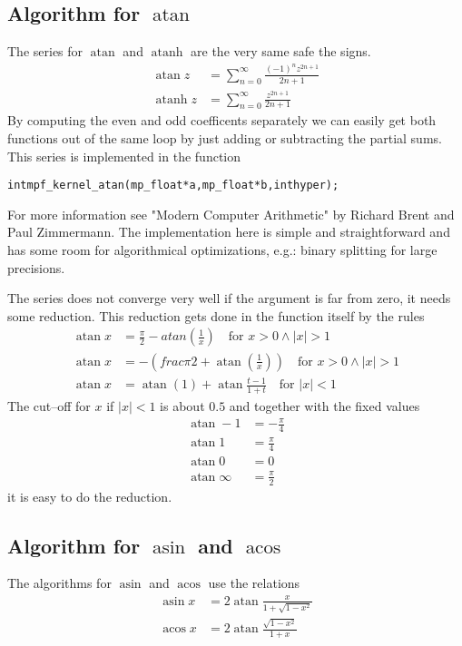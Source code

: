 \documentclass[a4paper]{book}
\theoremstyle{definition}
\theoremstyle{remark}
\DeclareMathOperator{\AND}{\wedge}
\DeclareMathOperator{\atan}{atan}
\DeclareMathOperator{\asin}{asin}
\DeclareMathOperator{\acos}{acos}
\DeclareMathOperator{\atanh}{atanh}
\begin{document}
\subsection{Algorithm for $\atan$}
The series for $\atan$ and $\atanh$ are the very same safe the signs.
\begin{align}
\atan z& = \sum_{n=0}^\infty \frac{(-1)^n z^{2n+1}}{2n+1}\\
\atanh z& = \sum_{n=0}^\infty \frac{ z^{2n+1}}{2n+1}
\end{align}
By computing the even and odd coefficents separately we can easily get both functions out of the same loop by just adding or subtracting the partial sums. This series is implemented in the function
\begin{alltt}
int  mpf_kernel_atan(mp_float * a, mp_float * b, int hyper);
\end{alltt}
For more information see "Modern Computer Arithmetic" by Richard Brent and Paul Zimmermann\cite{brent2010modern}. The implementation here is simple and straightforward and has some room for algorithmical optimizations, e.g.: binary splitting for large precisions.

The series does not converge very well if the argument is far from zero, it needs some reduction. This reduction gets done in the function itself by the rules
\begin{align}
\atan x& = \frac{\pi}{2} - atan\left(\frac{1}{x}\right)\quad\text{for } x > 0 \AND |x| > 1\\
\atan x& = -\left(frac{\pi}{2} + \atan\left(\frac{1}{x}\right)\right) \quad\text{for } x > 0 \AND |x| > 1\\
\atan x& = \atan(1) + \atan \frac{t-1}{1+t}\quad\text{for } |x| < 1
\end{align}
The cut--off for $x$ if $|x| < 1$ is about $0.5$ and together with the fixed values
\begin{align}
\atan -1& = - \frac{\pi}{4}\\
\atan 1& = \frac{\pi}{4}\\
\atan 0& = 0\\
\atan \infty& = \frac{\pi}{2}
\end{align}
it is easy to do the reduction.

\subsection{Algorithm for $\asin$ and $\acos$}
The algorithms for $\asin$ and $\acos$ use the relations
\begin{align}
\asin x& = 2 \atan \frac{x}{1 + \sqrt{1 -x^2} }\\
\acos x& = 2 \atan \frac{\sqrt{1 -x^2} }{1 + x }
\end{align}
\end{document}
